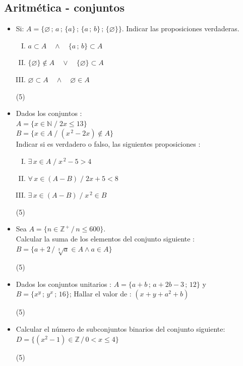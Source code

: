 \documentclass[11pt, twocolumn, landscape, a4paper]{article}
\begin{document}
\subsection*{Aritmética - conjuntos}
\begin{itemize}
\item{Si: $A = \{\varnothing\,;\,a\,;\,\{a\}\,;\,\{a\,;\,b\}\,;\,\{\varnothing\}\}$. Indicar las proposiciones verdaderas.

\begin{enumerate}[I.]
\item{$a \subset A\quad \wedge\quad \{a\,;\,b\} \subset A$}
\item{$\{\varnothing\} \notin A\quad \vee\quad \{\varnothing\} \subset A$}
\item{$\varnothing \subset A\quad \wedge\quad \varnothing \in A$}
\end{enumerate}

\begin{tasks}(5)
\end{tasks}
}
\item{Dados los conjuntos : \\
$A = \{x \in \mathbb{N}\;/\;2x \leq 13\}$ \\
$B = \{x \in A\;/\;(x^{\,2} - 2x) \notin A\}$ \\
Indicar si es verdadero o falso, las siguientes proposiciones :
\begin{enumerate}[I.]
\item{$\exists\,x \in A\;/\;x^{\,2} - 5 > 4$}
\item{$\forall\,x \in (A - B)\;/\;2x + 5 < 8$}
\item{$\exists\,x \in (A - B)\;/\;x^{\,2} \in B$}
\end{enumerate}
\begin{tasks}(5)
\end{tasks}
}
\item{Sea \qquad$A = \{n \in \mathbb{Z}^{\,+}\,/\,n\leq 600\}$. \\ Calcular la suma de los elementos del conjunto siguiente : \\ $B = \{a + 2\,/\,\sqrt[3]{a} \in A \wedge a \in A\}$
\begin{tasks}(5)
\end{tasks}
}
\item{Dados los conjuntos unitarios : $A = \{a + b\,;\,a + 2b - 3\,;\,12\}$ y $B = \{x^{y}\,;\,y^{x}\,;\,16\}$; Hallar el valor de : $(x + y + a^{2} + b)$
\begin{tasks}(5)
\end{tasks}
}
\item{Calcular el número de subconjuntos binarios del conjunto siguiente: \\ $D = \{ (x^{2} - 1) \in \mathbb{Z}\,/\,0 < x \leq 4\}$
\begin{tasks}(5)
\end{tasks}
}
\end{itemize}
\end{document}
